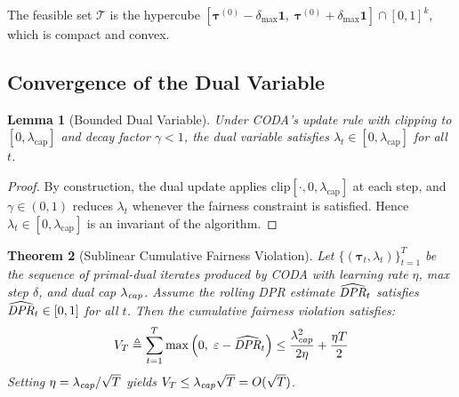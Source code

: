 \documentclass[10pt,twocolumn]{article}
\newtheorem{theorem}{Theorem}
\newtheorem{lemma}[theorem]{Lemma}
\theoremstyle{definition}
\begin{document}
The feasible set $\mathcal{T}$ is the hypercube $[\boldsymbol{\tau}^{(0)} - \delta_{\max}\mathbf{1}, \; \boldsymbol{\tau}^{(0)} + \delta_{\max}\mathbf{1}] \cap [0,1]^k$, which is compact and convex.

\subsection{Convergence of the Dual Variable}

\begin{lemma}[Bounded Dual Variable]
\label{lemma:bounded_dual}
Under CODA's update rule with clipping to $[0, \lambda_{\text{cap}}]$ and decay factor $\gamma < 1$, the dual variable satisfies $\lambda_t \in [0, \lambda_{\text{cap}}]$ for all $t$.
\end{lemma}
\begin{proof}
By construction, the dual update applies $\text{clip}[\cdot, 0, \lambda_{\text{cap}}]$ at each step, and $\gamma \in (0,1)$ reduces $\lambda_t$ whenever the fairness constraint is satisfied. Hence $\lambda_t \in [0, \lambda_{\text{cap}}]$ is an invariant of the algorithm.
\end{proof}

\begin{theorem}[Sublinear Cumulative Fairness Violation]
\label{thm:convergence}
Let $\{(\boldsymbol{\tau}_t, \lambda_t)\}_{t=1}^T$ be the sequence of primal-dual iterates produced by CODA with learning rate $\eta$, max step $\delta$, and dual cap $\lambda_{\emph{cap}}$. Assume the rolling DPR estimate $\widehat{\emph{DPR}}_t$ satisfies $\widehat{\emph{DPR}}_t \in [0,1]$ for all $t$. Then the cumulative fairness violation satisfies:
\begin{equation}
V_T \triangleq \sum_{t=1}^T \max\left(0, \; \varepsilon - \widehat{\emph{DPR}}_t\right) \leq \frac{\lambda_{\emph{cap}}^2}{2\eta} + \frac{\eta T}{2}
\label{eq:violation_bound}
\end{equation}
Setting $\eta = \lambda_{\emph{cap}} / \sqrt{T}$ yields $V_T \leq \lambda_{\emph{cap}}\sqrt{T} = O(\sqrt{T})$.
\end{theorem}
\end{document}
